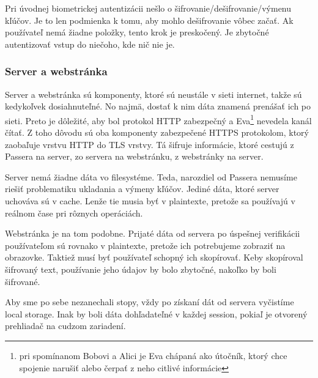 Pri úvodnej biometrickej autentizácii nešlo o šifrovanie/dešifrovanie/výmenu kľúčov. Je to len podmienka k tomu, aby mohlo dešifrovanie vôbec začať. Ak používateľ nemá žiadne položky, tento krok je preskočený. Je zbytočné autentizovať vstup do niečoho, kde nič nie je.

\subsubsection{Server a webstránka}
Server a webstránka sú komponenty, ktoré sú neustále v sieti internet, takže sú kedykoľvek dosiahnuteľné. No najmä, dostať k nim dáta znamená prenášať ich po sieti. Preto je dôležité, aby bol protokol HTTP zabezpečný a Eva\footnote{pri spomínanom Bobovi a Alici je Eva chápaná ako útočník, ktorý chce spojenie narušiť alebo čerpať z neho citlivé informácie} nevedela kanál čítať. Z toho dôvodu sú oba komponenty zabezpečené HTTPS protokolom, ktorý zaobaľuje vrstvu HTTP do TLS vrstvy. Tá šifruje informácie, ktoré cestujú z Passera na server, zo servera na webstránku, z webstránky na server.

Server nemá žiadne dáta vo filesystéme. Teda, narozdiel od Passera nemusíme riešiť problematiku ukladania a výmeny kľúčov. Jediné dáta, ktoré server uchováva sú v cache. Lenže tie musia byť v plaintexte, pretože sa používajú v reálnom čase pri rôznych operáciách.

Webstránka je na tom podobne. Prijaté dáta od servera po úspešnej verifikácii používateľom sú rovnako v plaintexte, pretože ich potrebujeme zobraziť na obrazovke. Taktiež musí byť používateľ schopný ich skopírovať. Keby skopíroval šifrovaný text, používanie jeho údajov by bolo zbytočné, nakoľko by boli šifrované.

Aby sme po sebe nezanechali stopy, vždy po získaní dát od servera vyčistíme local storage. Inak by boli dáta dohľadateľné v každej session, pokiaľ je otvorený prehliadač na cudzom zariadení.